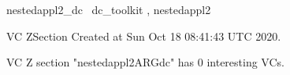 \documentclass{article}
\begin{document}

\begin{zsection}	 \SECTION nestedappl2\_dc \parents~dc\_toolkit , nestedappl2
\end{zsection}

\newcommand{\appliesTo}{\zbinop{appliesTo}} 
\newcommand{\appliesToNofix}{\zpreop{appliesToNofix}} 

VC ZSection Created at Sun Oct 18 08:41:43 UTC 2020.



 VC Z section "nestedappl2ARGdc" has $0$ interesting VCs.



\end{document}

